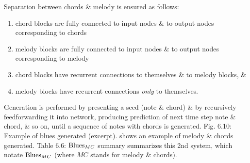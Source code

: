 \documentclass{article}
\begin{document}
\begin{itemize}
\begin{itemize}
\begin{itemize}
\begin{itemize}
				Separation between chords \& melody is ensured as follows:
				\begin{enumerate}
					\item chord blocks are fully connected to input nodes \& to output nodes corresponding to chords
					\item melody blocks are fully connected to input nodes \& to output nodes corresponding to melody
					\item chord blocks have recurrent connections to themselves \& to melody blocks, \&
					\item melody blocks have recurrent connections {\it only} to themselves.
				\end{enumerate}
				Generation is performed by presenting a seed (note \& chord) \& by recursively feedforwarding it into network, producing prediction of next time step note \& chord, \& so on, until a sequence of notes with chords is generated. {\sf Fig. 6.10: Example of blues generated (excerpt).} shows an example of melody \& chords generated. {\sf Table 6.6: ${\rm Blues}_{MC}$ summary} summarizes this 2nd system, which notate ${\rm Blues}_{MC}$ (where $MC$ stands for melody \& chords).
				

\end{itemize}
\end{itemize}
\end{itemize}
\end{itemize}
\end{document}
